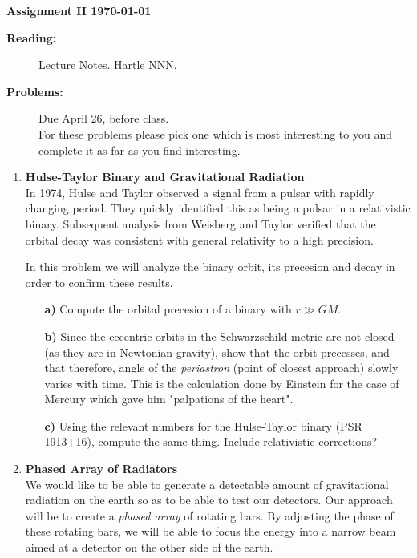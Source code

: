 \documentclass[11pt]{article}
\begin{document}
%
\centerline{\large\bf  \hfill Assignment II \hfill  \today}

\medskip
\begin{description}
\item[{\bf Reading:}] Lecture Notes. Hartle NNN. \\
\item[{\bf Problems:} \hfill ] Due April 26, before class. \\
For these problems please pick one which is most interesting to you and complete it as far as you find interesting.
\end{description}


\medskip

\begin{enumerate}

\item
{\bf Hulse-Taylor Binary and Gravitational Radiation} \\
In 1974, Hulse and Taylor observed a signal from a pulsar with rapidly changing period. They quickly identified this as being a pulsar in a relativistic binary. Subsequent analysis from Weisberg and Taylor verified that the orbital decay was consistent with general relativity to a high precision.

In this problem we will analyze the binary orbit, its precesion and decay in order to confirm these results.
\begin{itemize}

\item[\bf a)] Compute the orbital precesion of a binary with $r \gg G M$.

\item[\bf b)] Since the eccentric orbits in the Schwarzschild metric are not closed (as they are in Newtonian gravity), show that the orbit precesses, and that therefore, angle of the \emph{periastron} (point of closest approach) slowly varies with time. This is the calculation done by Einstein for the case of Mercury which gave him "palpations of the heart".

\item[\bf c)] Using the relevant numbers for the Hulse-Taylor binary (PSR 1913+16), compute the same thing. Include relativistic corrections?

\end{itemize}




\clearpage
\item
{\bf Phased Array of Radiators} \\
We would like to be able to generate a detectable amount of gravitational radiation on the earth so as to be able to test our detectors. Our approach will be to create a \emph{phased array} of rotating bars. By adjusting the phase of these rotating bars, we will be able to focus the energy into a narrow beam aimed at a detector on the other side of the earth.
\begin{itemize}


\end{itemize}
\end{enumerate}
\end{document}
